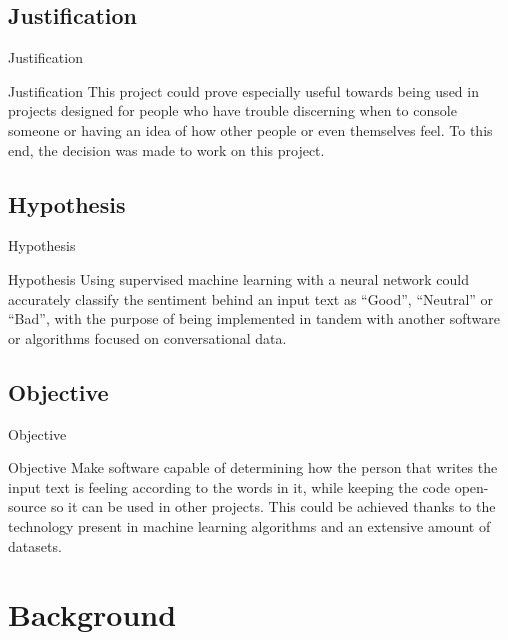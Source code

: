 \documentclass[11pt]{beamer}
\begin{document}
\subsection{Justification}
\begin{frame}{Justification}
  \begin{block}{Justification}
  This project could prove especially useful towards being used in projects designed for people who have trouble discerning when to console someone or having an idea of how other people or even themselves feel.
To this end, the decision was made to work on this project.
  \end{block}
\end{frame}

\subsection{Hypothesis}
\begin{frame}{Hypothesis}
  \begin{block}{Hypothesis}
  Using supervised machine learning with a neural network could accurately classify the sentiment behind an input text as ``Good'', ``Neutral'' or ``Bad'', with the purpose of being implemented in tandem with another software or algorithms focused on conversational data.
  \end{block}
\end{frame}

\subsection{Objective}
\begin{frame}{Objective}
  \begin{block}{Objective}
  Make software capable of determining how the person that writes the input text is feeling according to the words in it, while keeping the code open-source so it can be used in other projects. This could be achieved thanks to the technology present in machine learning algorithms and an extensive amount of datasets.
  \end{block}
\end{frame}

\section{Background}
\end{document}
